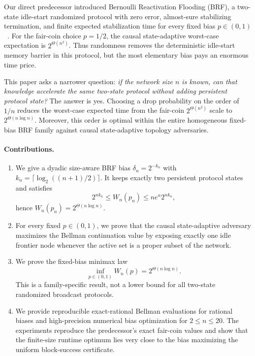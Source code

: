 \documentclass[11pt]{article}
\begin{document}
Our direct predecessor introduced Bernoulli Reactivation Flooding (BRF), a two-state idle-start randomized protocol with zero error, almost-sure stabilizing termination, and finite expected stabilization time for every fixed bias $p\in(0,1)$~\cite{yonezu2026brf}.  For the fair-coin choice $p=1/2$, the causal state-adaptive worst-case expectation is $2^{\Theta(n^2)}$.  Thus randomness removes the deterministic idle-start memory barrier in this protocol, but the most elementary bias pays an enormous time price.

This paper asks a narrower question: \emph{if the network size $n$ is known, can that knowledge accelerate the same two-state protocol without adding persistent protocol state?}  The answer is yes.  Choosing a drop probability on the order of $1/n$ reduces the worst-case expected time from the fair-coin $2^{\Theta(n^2)}$ scale to $2^{\Theta(n\log n)}$.  Moreover, this order is optimal within the entire homogeneous fixed-bias BRF family against causal state-adaptive topology adversaries.

\paragraph{Contributions.}
\begin{enumerate}[leftmargin=1.8em]
  \item We give a dyadic size-aware BRF bias $\delta_n=2^{-k_n}$ with $k_n=\lceil\log_2((n+1)/2)\rceil$.  It keeps exactly two persistent protocol states and satisfies
  \[
    2^{n k_n}\le W_n(p_n)\le n e^n 2^{n k_n},
  \]
  hence $W_n(p_n)=2^{\Theta(n\log n)}$.
  \item For every fixed $p\in(0,1)$, we prove that the causal state-adaptive adversary maximizes the Bellman continuation value by exposing exactly one idle frontier node whenever the active set is a proper subset of the network.
  \item We prove the fixed-bias minimax law
  \[
    \inf_{p\in(0,1)}W_n(p)=2^{\Theta(n\log n)}.
  \]
  This is a family-specific result, not a lower bound for all two-state randomized broadcast protocols.
  \item We provide reproducible exact-rational Bellman evaluations for rational biases and high-precision numerical bias optimization for $2\le n\le20$.  The experiments reproduce the predecessor's exact fair-coin values and show that the finite-size runtime optimum lies very close to the bias maximizing the uniform block-success certificate.
\end{enumerate}
\end{document}
